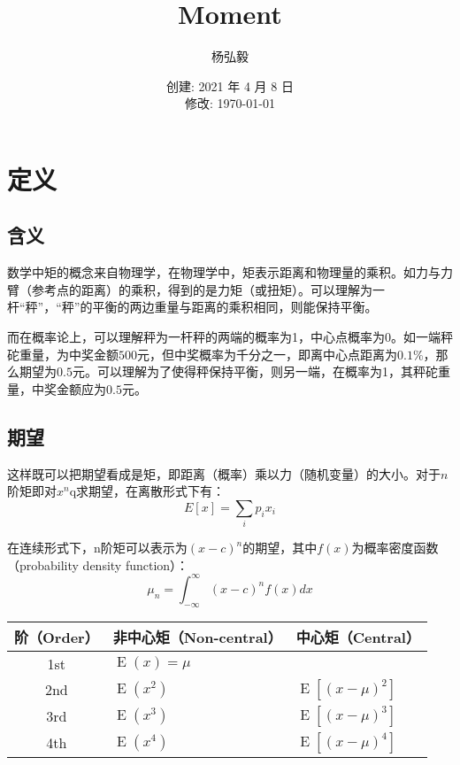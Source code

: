 \documentclass[11pt]{article}
\title{Moment}
\author{杨弘毅}
\date{创建: 2021 年 4 月 8 日 \\修改: \today}
\newcommand{\E}{\operatorname{E}}
\begin{document}
\maketitle

\tableofcontents

\section{定义}

\subsection{含义}
数学中矩的概念来自物理学，在物理学中，矩表示距离和物理量的乘积。如力与力臂（参考点的距离）的乘积，得到的是力矩（或扭矩）。可以理解为一杆“秤”，“秤”的平衡的两边重量与距离的乘积相同，则能保持平衡。

而在概率论上，可以理解秤为一杆秤的两端的概率为1，中心点概率为0。如一端秤砣重量，为中奖金额$500$元，但中奖概率为千分之一，即离中心点距离为$0.1\%$，那么期望为$0.5$元。可以理解为了使得秤保持平衡，则另一端，在概率为1，其秤砣重量，中奖金额应为$0.5$元。

\subsection{期望}

这样既可以把期望看成是矩，即距离（概率）乘以力（随机变量）的大小。对于$n$阶矩即对$x^n$q求期望，在离散形式下有：
\begin{equation*}
    E[x] = \sum_i p_i x_i
\end{equation*}

在连续形式下，n阶矩可以表示为$(x-c)^n$的期望，其中$f(x)$为概率密度函数（probability density function）：
\begin{equation*}
    \mu_n = \int_{-\infty}^{\infty} (x-c)^n f(x) dx
\end{equation*}

\begin{table}[ht!]
\centering
\begin{tabular}{@{}cll@{}}
\toprule
阶（Order） & \multicolumn{1}{c}{非中心矩（Non-central）} & \multicolumn{1}{c}{中心矩（Central）} \\ \midrule
1st & $\E(x)=\mu $ & \\
2nd & $\E(x^2) $ & $\E[(x-\mu)^2]$   \\
3rd & $\E(x^3) $ & $\E[(x-\mu)^3]$   \\
4th & $\E(x^4) $ & $\E[(x-\mu)^4]$   \\ \bottomrule
\end{tabular}
\end{table}
\end{document}
